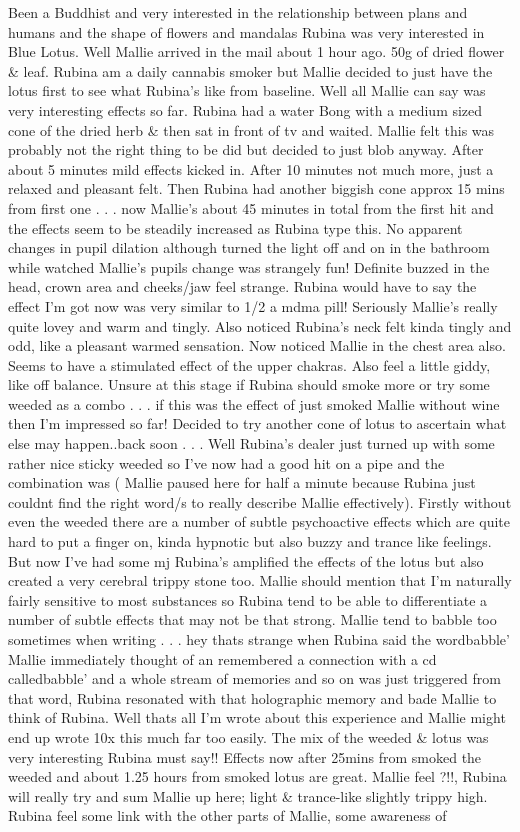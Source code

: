 \documentclass[12pt]{book}
\begin{document}
Been a Buddhist and very interested in the relationship between plans and humans and the shape of flowers and mandalas Rubina was very interested in Blue Lotus. Well Mallie arrived in the mail about 1 hour ago. 50g of dried flower \& leaf. Rubina am a daily cannabis smoker but Mallie decided to just have the lotus first to see what Rubina's like from baseline. Well all Mallie can say was very interesting effects so far. Rubina had a water Bong with a medium sized cone of the dried herb \& then sat in front of tv and waited. Mallie felt this was probably not the right thing to be did but decided to just blob anyway. After about 5 minutes mild effects kicked in. After 10 minutes not much more, just a relaxed and pleasant felt. Then Rubina had another biggish cone approx 15 mins from first one . . .  now Mallie's about 45 minutes in total from the first hit and the effects seem to be steadily increased as Rubina type this. No apparent changes in pupil dilation although turned the light off and on in the bathroom while watched Mallie's pupils change was strangely fun! Definite buzzed in the head, crown area and cheeks/jaw feel strange. Rubina would have to say the effect I'm got now was very similar to 1/2 a mdma pill! Seriously Mallie's really quite lovey and warm and tingly. Also noticed Rubina's neck felt kinda tingly and odd, like a pleasant warmed sensation. Now noticed Mallie in the chest area also. Seems to have a stimulated effect of the upper chakras. Also feel a little giddy, like off balance. Unsure at this stage if Rubina should smoke more or try some weeded as a combo . . .  if this was the effect of just smoked Mallie without wine then I'm impressed so far! Decided to try another cone of lotus to ascertain what else may happen..back soon . . .  Well Rubina's dealer just turned up with some rather nice sticky weeded so I've now had a good hit on a pipe and the combination was ( Mallie paused here for half a minute because Rubina just couldnt find the right word/s to really describe Mallie effectively). Firstly without even the weeded there are a number of subtle psychoactive effects which are quite hard to put a finger on, kinda hypnotic but also buzzy and trance like feelings. But now I've had some mj Rubina's amplified the effects of the lotus but also created a very cerebral trippy stone too. Mallie should mention that I'm naturally fairly sensitive to most substances so Rubina tend to be able to differentiate a number of subtle effects that may not be that strong. Mallie tend to babble too sometimes when writing . . .  hey thats strange when Rubina said the wordbabble' Mallie immediately thought of an remembered a connection with a cd calledbabble' and a whole stream of memories and so on was just triggered from that word, Rubina resonated with that holographic memory and bade Mallie to think of Rubina. Well thats all I'm wrote about this experience and Mallie might end up wrote 10x this much far too easily. The mix of the weeded \& lotus was very interesting Rubina must say!! Effects now after 25mins from smoked the weeded and about 1.25 hours from smoked lotus are great. Mallie feel ?!!, Rubina will really try and sum Mallie up here; light \& trance-like slightly trippy high. Rubina feel some link with the other parts of Mallie, some awareness of 
\end{document}
